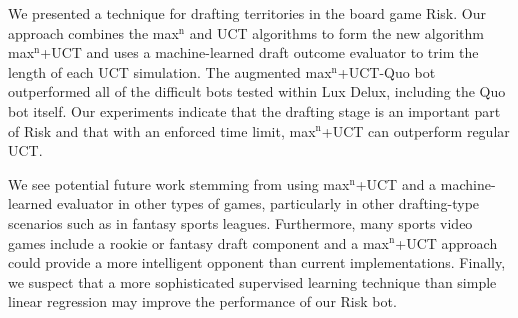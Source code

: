 \documentclass[letterpaper]{article}
\numberwithin{equation}{section}
\numberwithin{theorem}{section}
\numberwithin{lemma}{section}
\numberwithin{df}{section}
\begin{document}


We presented a technique for drafting territories in the board game Risk.  Our approach combines the max$^\text{n}$ and UCT algorithms to form the new algorithm max$^\text{n}$+UCT and uses a machine-learned draft outcome evaluator to trim the length of each UCT simulation.  The augmented max$^\text{n}$+UCT-Quo bot outperformed all of the difficult bots tested within Lux Delux, including the Quo bot itself.  Our experiments indicate that the drafting stage is an important part of Risk and that with an enforced time limit, max$^\text{n}$+UCT can outperform regular UCT. 

We see potential future work stemming from using max$^\text{n}$+UCT and a machine-learned evaluator in other types of games, particularly in other drafting-type scenarios such as in fantasy sports leagues.  Furthermore, many sports video games include a rookie or fantasy draft component and a max$^\text{n}$+UCT approach could provide a more intelligent opponent than current implementations.  Finally, we suspect that a more sophisticated supervised learning technique than simple linear regression may improve the performance of our Risk bot.  


%
%


\end{document}
